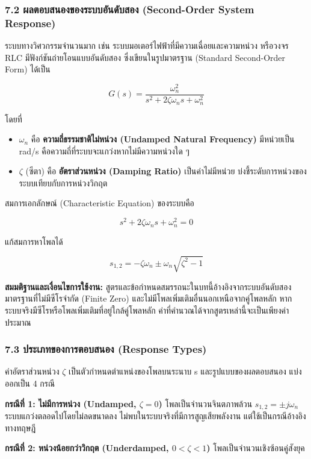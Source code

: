 \subsubsection{7.2 ผลตอบสนองของระบบอันดับสอง (Second-Order System Response)}

ระบบทางวิศวกรรมจำนวนมาก เช่น ระบบมอเตอร์ไฟฟ้าที่มีความเฉื่อยและความหน่วง หรือวงจร RLC มีฟังก์ชันถ่ายโอนแบบอันดับสอง ซึ่งเขียนในรูปมาตรฐาน (Standard Second-Order Form) ได้เป็น

\[
G(s) = \frac{\omega_n^2}{s^2 + 2\zeta\omega_n s + \omega_n^2}
\]

โดยที่

\begin{itemize}
    \item $\omega_n$ คือ \textbf{ความถี่ธรรมชาติไม่หน่วง (Undamped Natural Frequency)} มีหน่วยเป็น rad/s คือความถี่ที่ระบบจะแกว่งหากไม่มีความหน่วงใด ๆ
    \item $\zeta$ (ซีตา) คือ \textbf{อัตราส่วนหน่วง (Damping Ratio)} เป็นค่าไม่มีหน่วย บ่งชี้ระดับการหน่วงของระบบเทียบกับการหน่วงวิกฤต
\end{itemize}

สมการเอกลักษณ์ (Characteristic Equation) ของระบบคือ

\[
s^2 + 2\zeta\omega_n s + \omega_n^2 = 0
\]

แก้สมการหาโพลได้

\[
s_{1,2} = -\zeta\omega_n \pm \omega_n\sqrt{\zeta^2-1}
\]

\textbf{สมมติฐานและเงื่อนไขการใช้งาน:} สูตรและข้อกำหนดสมรรถนะในบทนี้อ้างอิงจากระบบอันดับสองมาตรฐานที่ไม่มีซีโรจำกัด (Finite Zero) และไม่มีโพลเพิ่มเติมอื่นนอกเหนือจากคู่โพลหลัก หากระบบจริงมีซีโรหรือโพลเพิ่มเติมที่อยู่ใกล้คู่โพลหลัก ค่าที่คำนวณได้จากสูตรเหล่านี้จะเป็นเพียงค่าประมาณ


\subsubsection{7.3 ประเภทของการตอบสนอง (Response Types)}

ค่าอัตราส่วนหน่วง $\zeta$ เป็นตัวกำหนดตำแหน่งของโพลบนระนาบ s และรูปแบบของผลตอบสนอง แบ่งออกเป็น 4 กรณี

\textbf{กรณีที่ 1: ไม่มีการหน่วง (Undamped, $\zeta = 0$)}
โพลเป็นจำนวนจินตภาพล้วน $s_{1,2}=\pm j\omega_n$ ระบบแกว่งตลอดไปโดยไม่ลดขนาดลง ไม่พบในระบบจริงที่มีการสูญเสียพลังงาน แต่ใช้เป็นกรณีอ้างอิงทางทฤษฎี

\textbf{กรณีที่ 2: หน่วงน้อยกว่าวิกฤต (Underdamped, $0 < \zeta < 1$)}
โพลเป็นจำนวนเชิงซ้อนคู่สังยุค

